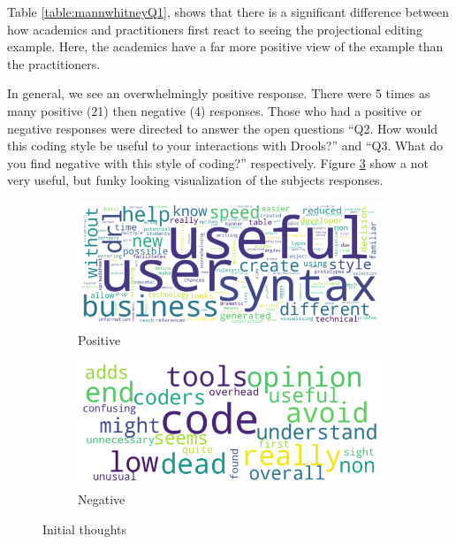 Table \ref{table:mannwhitneyQ1}, shows that there is a significant difference between how academics and practitioners first react to seeing the projectional editing example.
Here, the academics have a far more positive view of the example than the practitioners.

In general, we see an overwhelmingly positive response.
There were 5 times as many positive (21) then negative (4) responses.
Those who had a positive or negative responses were directed to answer the open questions ``Q2. How would this coding style be useful to your interactions with Drools?'' and ``Q3. What do you find negative with this style of coding?'' respectively.
Figure \ref{fig:wordclouds} show a not very useful, but funky looking visualization of the subjects responses.

\begin{figure}[H]
    \begin{subfigure}{.60\textwidth}
      \centering
      \includegraphics[width=.95\linewidth]{Sections/images/positive_wordcloud.png}
      \caption{Positive}
      \label{fig:wfig1}
    \end{subfigure}%
    \begin{subfigure}{.40\textwidth}
      \centering
      \includegraphics[width=.95\linewidth]{Sections/images/negative_wordcloud.png}
      \caption{Negative}
      \label{fig:wfig2}
    \end{subfigure}
    \caption{Initial thoughts}
    \label{fig:wordclouds}
\end{figure}

